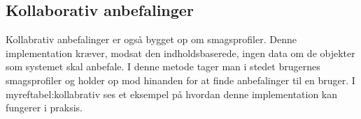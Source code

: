 \subsection{Kollaborativ anbefalinger}
Kollabrativ anbefalinger er også bygget op om smagsprofiler.
Denne implementation kræver, modsat den indholdsbaserede, ingen data om de objekter som systemet skal anbefale. I denne metode tager man i stedet brugernes smagsprofiler og holder op mod hinanden for at finde anbefalinger til en bruger. I myref{tabel:kollabrativ} ses et eksempel på hvordan denne implementation kan fungerer i praksis.



